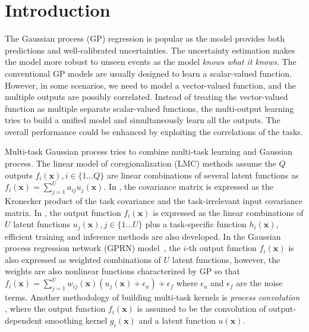 \section{Introduction}

The Gaussian process (GP) regression is popular as the model provides both predictions and well-calibrated uncertainties. The uncertainty estimation makes the model more robust to unseen events as the model \emph{knows what it knows}. The conventional GP models are usually designed to learn a scalar-valued function. However, in some scenarios, we need to model a vector-valued function, and the multiple outputs are possibly correlated. Instead of treating the vector-valued function as multiple separate scalar-valued functions, the multi-output learning \cite{zhang2017survey} tries to build a unified model and simultaneously learn all the outputs. The overall performance could be enhanced by exploiting the correlations of the tasks.

Multi-task Gaussian process \cite{vectorvaluedkernel} tries to combine multi-task learning and Gaussian process. The linear model of coregionalization (LMC) methods \cite{journel1978mining} assume the $Q$ outputs $f_i(\bm{x}), i \in \{1\dots Q\}$ are linear combinations of several latent functions as $f_i(\bm{x}) = \sum_{j=1}^U a_{ij} u_j(\bm{x})$. In \cite{bonilla2008multi}, the covariance matrix is expressed as the Kronecker product of the task covariance and the task-irrelevant input covariance matrix. In \cite{nguyen2014collaborative}, the output function $f_i(\bm{x})$ is expressed as the linear combinations of $U$ latent functions $u_j(\bm{x}), j \in \{1\dots U\}$ plus a task-specific function $h_i(\bm{x})$, efficient training and inference methods are also developed. In the Gaussian process regression network (GPRN) model~\cite{wilson2012gaussian}, the $i$-th output function $f_i(\bm{x})$ is also expressed as weighted combinations of $U$ latent functions, however, the weights are also nonlinear functions characterized by GP so that $f_i(\bm{x}) = \sum_{j=1}^U w_{ij}(\bm{x}) (u_j(\bm{x}) + \epsilon_u) + \epsilon_f$ where $\epsilon_u$ and $\epsilon_f$ are the noise terms. Another methodology of building multi-task kernels is \emph{process convolution} \cite{boyle2005dependent,alvarez2009sparse,alvarez2011computationally}, where the output function $f_i(\bm{x})$ is assumed to be the convolution of output-dependent smoothing kernel $g_i(\bm{x})$ and a latent function $u(\bm{x})$.

